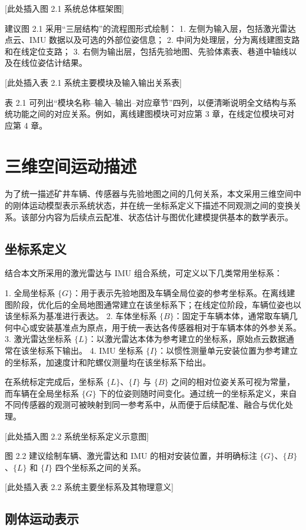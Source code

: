 [此处插入图 2.1 系统总体框架图]

建议图 2.1 采用“三层结构”的流程图形式绘制：
1. 左侧为输入层，包括激光雷达点云、IMU 数据以及可选的外部位姿信息；
2. 中间为处理层，分为离线建图支路和在线定位支路；
3. 右侧为输出层，包括先验地图、先验体素表、巷道中轴线以及在线位姿估计结果。

[此处插入表 2.1 系统主要模块及输入输出关系表]

表 2.1 可列出“模块名称--输入--输出--对应章节”四列，以便清晰说明全文结构与系统功能之间的对应关系。例如，离线建图模块可对应第 3 章，在线定位模块可对应第 4 章。

\section{三维空间运动描述}

为了统一描述矿井车辆、传感器与先验地图之间的几何关系，本文采用三维空间中的刚体运动模型表示系统状态，并在统一坐标系定义下描述不同观测之间的变换关系。该部分内容为后续点云配准、状态估计与图优化建模提供基本的数学表示。

\subsection{坐标系定义}

结合本文所采用的激光雷达与 IMU 组合系统，可定义以下几类常用坐标系：

1. 全局坐标系 $\{G\}$：用于表示先验地图及车辆全局位姿的参考坐标系。在离线建图阶段，优化后的全局地图通常建立在该坐标系下；在线定位阶段，车辆位姿也以该坐标系为基准进行表达。
2. 车体坐标系 $\{B\}$：固定于车辆本体，通常取车辆几何中心或安装基准点为原点，用于统一表达各传感器相对于车辆本体的外参关系。
3. 激光雷达坐标系 $\{L\}$：以激光雷达本体为参考建立的坐标系，原始点云数据通常在该坐标系下输出。
4. IMU 坐标系 $\{I\}$：以惯性测量单元安装位置为参考建立的坐标系，加速度计和陀螺仪测量均在该坐标系下给出。

在系统标定完成后，坐标系 $\{L\}$、$\{I\}$ 与 $\{B\}$ 之间的相对位姿关系可视为常量，而车辆在全局坐标系 $\{G\}$ 下的位姿则随时间变化。通过统一的坐标系定义，来自不同传感器的观测可被映射到同一参考系中，从而便于后续配准、融合与优化处理。

[此处插入图 2.2 系统坐标系定义示意图]

图 2.2 建议绘制车辆、激光雷达和 IMU 的相对安装位置，并明确标注 $\{G\}$、$\{B\}$、$\{L\}$ 和 $\{I\}$ 四个坐标系之间的关系。

[此处插入表 2.2 系统主要坐标系及其物理意义]

\subsection{刚体运动表示}

